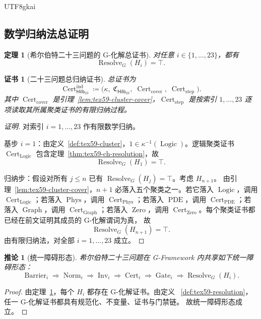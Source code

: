 \documentclass[12pt]{article}
\newtheorem{theorem}{定理}[section]
\newtheorem{corollary}{推论}[section]
\newtheorem{Certificate}{证书}[section]
\newcommand{\GFramework}{\textsf{G-Framework}}
\newcommand{\Hilb}{\mathsf{Hilb}_{23}}
\newcommand{\DefEq}{\coloneqq}
\DeclareMathOperator{\Cert}{Cert}
\DeclareMathOperator{\Resolve}{Resolve}
\DeclareMathOperator{\Barrier}{Barrier}
\DeclareMathOperator{\Norm}{Norm}
\DeclareMathOperator{\Gate}{Gate}
\DeclareMathOperator{\Inv}{Inv}
\DeclareMathOperator{\Graph}{Graph}
\DeclareMathOperator{\Zero}{Zero}
\DeclareMathOperator{\PDE}{PDE}
\DeclareMathOperator{\Phys}{Phys}
\DeclareMathOperator{\Logic}{Logic}
\begin{document}
\begin{CJK*}{UTF8}{gkai}
\subsection{数学归纳法总证明}
\label{subsec:tex59-total-proof}

\begin{theorem}[希尔伯特二十三问题的 G-化解总证书]
\label{thm:tex59-total-resolution}
对任意 \(i\in\{1,\ldots,23\}\)，都有
\[
  \Resolve_G(H_i)=\top.
\]
\end{theorem}

\begin{Certificate}[二十三问题总归纳证书]
\label{cert:tex59-total-induction}
总证书为
\[
  \Cert_{\Hilb}^{\mathrm{ind}}
  \DefEq
  \bigl(
    \kappa,\;
    \mathfrak C_{\Hilb},\;
    \Cert_{\mathrm{cover}},\;
    \Cert_{\mathrm{step}}
  \bigr).
\]
其中 \(\Cert_{\mathrm{cover}}\) 是引理~\ref{lem:tex59-cluster-cover}，\(\Cert_{\mathrm{step}}\)
是按索引 \(1,\ldots,23\) 逐项读取其所属聚类证书的有限归纳过程。
\end{Certificate}

\begin{proof}[证明]
对索引 \(i=1,\ldots,23\) 作有限数学归纳。

基步 \(i=1\)：由定义~\ref{def:tex59-cluster}，\(1\in\kappa^{-1}(\Logic)\)。逻辑聚类证书
\(\Cert_{\Logic}\) 包含定理~\ref{thm:tex59-ch-resolution}，故
\[
  \Resolve_G(H_1)=\top.
\]

归纳步：假设对所有 \(j\le n\) 已有 \(\Resolve_G(H_j)=\top\)。考虑 \(H_{n+1}\)。
由引理~\ref{lem:tex59-cluster-cover}，\(n+1\) 必落入五个聚类之一。若它落入
\(\Logic\)，调用 \(\Cert_{\Logic}\)；若落入 \(\Phys\)，调用 \(\Cert_{\Phys}\)；若落入
\(\PDE\)，调用 \(\Cert_{\PDE}\)；若落入 \(\Graph\)，调用 \(\Cert_{\Graph}\)；若落入
\(\Zero\)，调用 \(\Cert_{\Zero}\)。每个聚类证书都已经在前文证明其成员的 G-化解谓词为真，
故
\[
  \Resolve_G(H_{n+1})=\top.
\]
由有限归纳法，对全部 \(i=1,\ldots,23\) 成立。
\end{proof}

\begin{corollary}[统一障碍形态]
\label{cor:tex59-unified-obstruction}
希尔伯特二十三问题在 \GFramework{} 内共享如下统一障碍形态：
\[
  \boxed{
  \Barrier_i
  \Longrightarrow
  \Norm_i
  \Longrightarrow
  \Inv_i
  \Longrightarrow
  \Cert_i
  \Longrightarrow
  \Gate_i
  \Longrightarrow
  \Resolve_G(H_i).
  }
\]
\end{corollary}

\begin{proof}
由定理~\ref{thm:tex59-total-resolution}，每个 \(H_i\) 都存在 G-化解证书。由定义
~\ref{def:tex59-resolution}，任一 G-化解证书都具有规范化、不变量、证书与门禁链。
故统一障碍形态成立。
\end{proof}


\end{CJK*}
\end{document}
